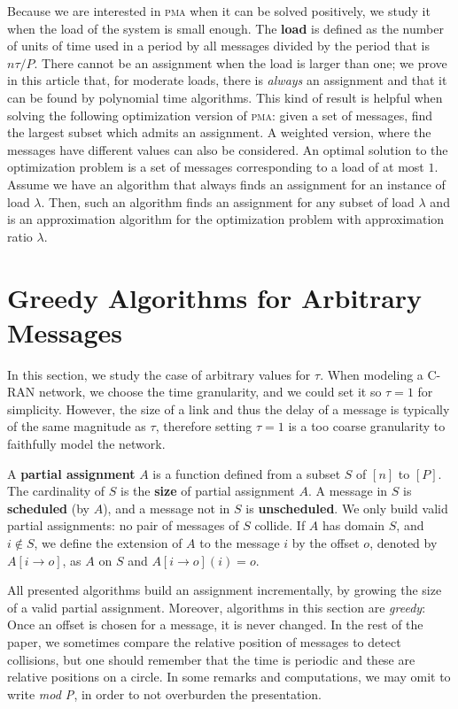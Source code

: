 \documentclass[a4paper,UKenglish,cleveref, autoref, thm-restate]{lipics-v2019}
\newcommand\pma{\textsc{pma}\xspace}
\begin{document}
Because we are interested in \pma when it can be solved positively, we study it when the load of the system is small enough. The \textbf{load} is defined as the number of units of time used in a period by all messages divided by the period that is $n\tau /P$. There cannot be an assignment when the load is larger than one; we prove in this article that, for moderate loads, there is \emph{always} an assignment and that it can be found by polynomial time algorithms. This kind of result is helpful when solving the following optimization version of \pma: given a set of messages, find the largest subset which admits an assignment. A weighted version, where the messages have different values can also be considered. An optimal solution to the optimization problem is a set of messages corresponding to a load of at most $1$. Assume we have an algorithm that always finds an assignment for an instance of load $\lambda$. Then, such an algorithm finds an assignment for any subset of load $\lambda$ and is an approximation algorithm for the optimization problem with approximation ratio $\lambda$.


\section{Greedy Algorithms for Arbitrary Messages} \label{sec:large}

In this section, we study the case of arbitrary values for $\tau$. When modeling a C-RAN network, we choose the time granularity, and we could set it so $\tau = 1$ for simplicity. However, the size of a link and thus the delay of a message is typically of the same magnitude as $\tau$, therefore setting $\tau = 1$ is a too coarse granularity to faithfully model the network.

A \textbf{partial assignment} $A$ is a function defined from a subset $S$ of $[n]$ to $[P]$.
The cardinality of $S$ is the \textbf{size} of partial assignment $A$. A message in $S$ is \textbf{scheduled} (by $A$), and a message not in $S$ is \textbf{unscheduled}. We only build valid partial assignments: no pair of messages of $S$ collide. If $A$ has domain $S$, and $i \notin S$, we define the extension of $A$ to the message $i$ by the offset $o$, denoted by $A[i \rightarrow o]$, as $A$ on $S$ and $A[i \rightarrow o](i) = o$.

All presented algorithms build an assignment incrementally, by growing the size of a valid partial assignment. Moreover, algorithms in this section are \emph{greedy}: Once an offset is chosen for a message, it is never changed. In the rest of the paper, we sometimes compare the relative position of messages to detect collisions, but one should remember that the time is periodic and these are relative positions on a circle. 
In some remarks and computations, we may omit to write \emph{mod P}, in order to not overburden the presentation.
\end{document}
